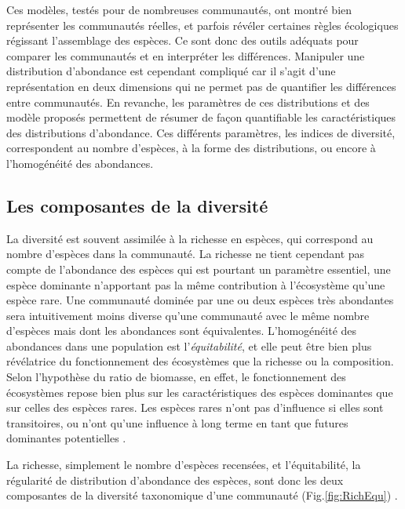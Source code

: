 \documentclass[
  11pt,
  french,
  A4paper,
  extrafontsizes,onecolumn,openright
  ]{memoir}
\begin{document}
Ces modèles, testés pour de nombreuses communautés, ont montré bien
représenter les communautés réelles, et parfois révéler certaines règles
écologiques régissant l'assemblage des espèces. Ce sont donc des outils
adéquats pour comparer les communautés et en interpréter les
différences. Manipuler une distribution d'abondance est cependant
compliqué car il s'agit d'une représentation en deux dimensions qui ne
permet pas de quantifier les différences entre communautés. En revanche,
les paramètres de ces distributions et des modèle proposés permettent de
résumer de façon quantifiable les caractéristiques des distributions
d'abondance. Ces différents paramètres, les indices de diversité,
correspondent au nombre d'espèces, à la forme des distributions, ou
encore à l'homogénéité des abondances.

\subsection{Les composantes de la
diversité}\label{les-composantes-de-la-diversite}

La diversité est souvent assimilée à la richesse en espèces, qui
correspond au nombre d'espèces dans la communauté. La richesse ne tient
cependant pas compte de l'abondance des espèces qui est pourtant un
paramètre essentiel, une espèce dominante n'apportant pas la même
contribution à l'écosystème qu'une espèce rare. Une communauté dominée
par une ou deux espèces très abondantes sera intuitivement moins diverse
qu'une communauté avec le même nombre d'espèces mais dont les abondances
sont équivalentes. L'homogénéité des abondances dans une population est
l'\emph{équitabilité}, et elle peut être bien plus révélatrice du
fonctionnement des écosystèmes que la richesse ou la composition. Selon
l'hypothèse du ratio de biomasse, en effet, le fonctionnement des
écosystèmes repose bien plus sur les caractéristiques des espèces
dominantes que sur celles des espèces rares. Les espèces rares n'ont pas
d'influence si elles sont transitoires, ou n'ont qu'une influence à long
terme en tant que futures dominantes potentielles \autocite{Grime1998}.

La richesse, simplement le nombre d'espèces recensées, et
l'équitabilité, la régularité de distribution d'abondance des espèces,
sont donc les deux composantes de la diversité taxonomique d'une
communauté (Fig.\ref{fig:RichEqu})
\autocites{Whittaker1965}{Magurran2004}.
\end{document}

